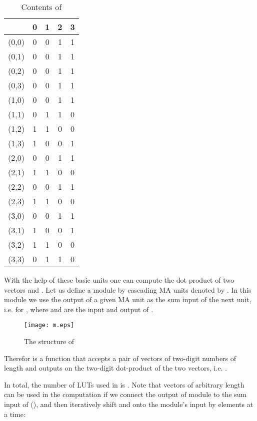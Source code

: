 \documentclass[11pt,twoside]{article}
\begin{document}
\begin{table}[h!]
\centering
\begin{tabular} { | c | c | c | c | c |}
\hline
\backslashbox{()}{} & 0 & 1 & 2 & 3 \\ \hline
(0,0) & 0 & 0 & 1 & 1 \\ \hline
(0,1) & 0 & 0 & 1 & 1 \\ \hline
(0,2) & 0 & 0 & 1 & 1 \\ \hline
(0,3) & 0 & 0 & 1 & 1 \\ \hline
(1,0) & 0 & 0 & 1 & 1 \\ \hline
(1,1) & 0 & 1 & 1 & 0 \\ \hline
(1,2) & 1 & 1 & 0 & 0 \\ \hline
(1,3) & 1 & 0 & 0 & 1 \\ \hline
(2,0) & 0 & 0 & 1 & 1 \\ \hline
(2,1) & 1 & 1 & 0 & 0 \\ \hline
(2,2) & 0 & 0 & 1 & 1 \\ \hline
(2,3) & 1 & 1 & 0 & 0 \\ \hline
(3,0) & 0 & 0 & 1 & 1 \\ \hline
(3,1) & 1 & 0 & 0 & 1 \\ \hline
(3,2) & 1 & 1 & 0 & 0 \\ \hline
(3,3) & 0 & 1 & 1 & 0 \\ \hline
\end{tabular}
\caption{Contents of }
\end{table}


With the help of these basic units one can compute the dot product  of two vectors  and . Let us define a module  by cascading  MA units denoted by . In this module  we use the output of a given MA unit as the sum input of the next unit, i.e.  for , where  and  are the  input and  output of .
\begin{figure}[h!]
\centering
\texttt{[image: m.eps]}
\caption{The structure of }
\end{figure}

Therefor  is a function that accepts a pair of vectors  of two-digit numbers of length  and outputs on  the two-digit dot-product of the two vectors, i.e. .

In total, the number of LUTs used in  is . Note that vectors of arbitrary length can be used in the computation if we connect the output of module  to the sum input of  (), and then iteratively shift  and  onto the module's input by  elements at a time:
\\
\\
\\
\end{document}
